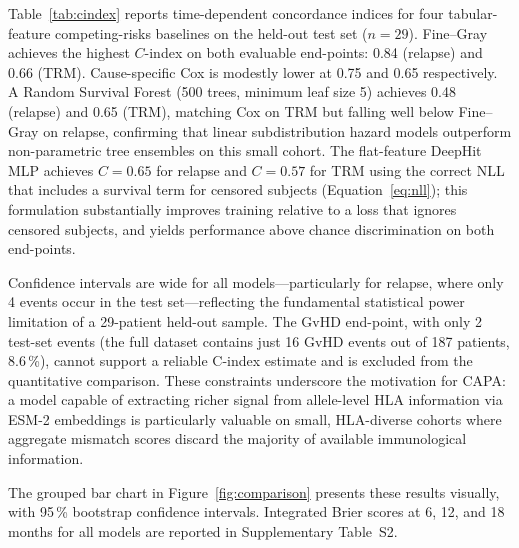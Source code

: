 \documentclass[11pt,a4paper]{article}
\begin{document}
Table~\ref{tab:cindex} reports time-dependent concordance indices for four
tabular-feature competing-risks baselines on the held-out test set ($n=29$).
Fine--Gray achieves the highest $C$-index on both evaluable end-points: 0.84
(relapse) and 0.66 (TRM).  Cause-specific Cox is modestly lower at 0.75 and
0.65 respectively.  A Random Survival Forest (500 trees, minimum leaf size 5)
achieves 0.48 (relapse) and 0.65 (TRM), matching Cox on TRM but falling well
below Fine--Gray on relapse, confirming that linear subdistribution hazard models
outperform non-parametric tree ensembles on this small cohort.  The flat-feature
DeepHit MLP achieves $C = 0.65$ for relapse and $C = 0.57$ for TRM using the
correct NLL that includes a survival term for censored subjects
(Equation~\ref{eq:nll}); this formulation substantially improves training
relative to a loss that ignores censored subjects, and yields performance above
chance discrimination on both end-points.

Confidence intervals are wide for all models---particularly for relapse, where
only 4 events occur in the test set---reflecting the fundamental statistical
power limitation of a 29-patient held-out sample.  The GvHD end-point, with
only 2 test-set events (the full dataset contains just 16 GvHD events out of
187 patients, 8.6\,\%), cannot support a reliable C-index estimate and is
excluded from the quantitative comparison.  These constraints underscore the
motivation for CAPA: a model capable of extracting richer signal from
allele-level HLA information via ESM-2 embeddings is particularly valuable on
small, HLA-diverse cohorts where aggregate mismatch scores discard the majority
of available immunological information.

The grouped bar chart in Figure~\ref{fig:comparison} presents these results
visually, with 95\,\% bootstrap confidence intervals.  Integrated Brier
scores at 6, 12, and 18 months for all models are reported in Supplementary
Table~S2.
\end{document}

